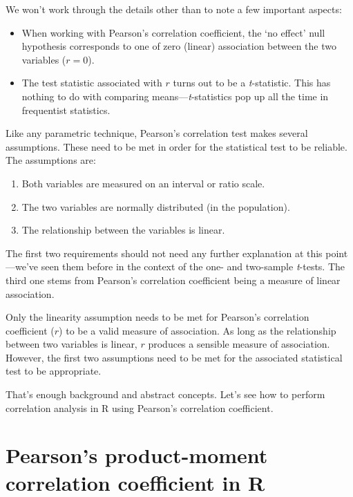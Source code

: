 \documentclass[
]{book}
\providecommand{\tightlist}{%
  \setlength{\itemsep}{0pt}\setlength{\parskip}{0pt}}
\begin{document}
We won't work through the details other than to note a few important aspects:

\begin{itemize}
\tightlist
\item
  When working with Pearson's correlation coefficient, the `no effect' null hypothesis corresponds to one of zero (linear) association between the two variables (\(r=0\)).
\item
  The test statistic associated with \(r\) turns out to be a \emph{t}-statistic. This has nothing to do with comparing means---\emph{t}-statistics pop up all the time in frequentist statistics.
\end{itemize}

Like any parametric technique, Pearson's correlation test makes several assumptions. These need to be met in order for the statistical test to be reliable. The assumptions are:

\begin{enumerate}
\def\labelenumi{\arabic{enumi}.}
\tightlist
\item
  Both variables are measured on an interval or ratio scale.
\item
  The two variables are normally distributed (in the population).
\item
  The relationship between the variables is linear.
\end{enumerate}

The first two requirements should not need any further explanation at this point---we've seen them before in the context of the one- and two-sample \emph{t}-tests. The third one stems from Pearson's correlation coefficient being a measure of linear association.

Only the linearity assumption needs to be met for Pearson's correlation coefficient (\(r\)) to be a valid measure of association. As long as the relationship between two variables is linear, \(r\) produces a sensible measure of association. However, the first two assumptions need to be met for the associated statistical test to be appropriate.

That's enough background and abstract concepts. Let's see how to perform correlation analysis in R using Pearson's correlation coefficient.

\hypertarget{pearsons-product-moment-correlation-coefficient-in-r}{%
\section{Pearson's product-moment correlation coefficient in R}\label{pearsons-product-moment-correlation-coefficient-in-r}}
\end{document}
